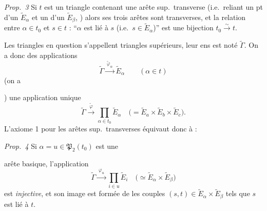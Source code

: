 \documentclass[11pt,a4paper]{article}
\begin{document}
\emph{Prop.~3} Si $t$ est un triangle contenant une arête sup.\ transverse (i.e.\ reliant un pt d'un $\widetilde{E}_{\alpha}$ et un d'un $\widetilde{E}_{\beta}$, ) alors ses trois arêtes sont transverses, et la relation entre $\alpha\in t_0$ et $s\in t$ : ``$\alpha$ est lié à $s$ (i.e.\ $s\in\widetilde{E}_{\alpha}$)'' est une bijection $t_0\xrightarrow{\sim}t$.

Les triangles en question s'appellent triangles supérieurs, leur ens est noté $\widetilde{\Gamma}$. On a donc des applications
\[
  \widetilde{\Gamma}\xrightarrow{\ \widetilde{\varphi}_{\alpha}\ }\widetilde{E}_{\alpha}\qquad(\alpha\in t)
\]
(on a


)   une application unique
\[
  \widetilde{\Gamma}\xrightarrow{\ \widetilde{\varphi}\ }\prod_{\alpha\in t_0}\widetilde{E}_{\alpha}
  \quad\bigl(=\widetilde{E}_{a}\times\widetilde{E}_{b}\times\widetilde{E}_{c}\bigr).
\]
L'axiome 1 pour les arêtes sup.\ transverses équivaut donc à :

\emph{Prop.~4} Si  $\alpha=u\in\mathfrak{P}_2(t_0)$ est une

arête basique,  l'application
\[
  \widetilde{\Gamma}\xrightarrow{\ \varphi_u\ }\prod_{i\in u}\widetilde{E}_i\quad\bigl(\simeq\widetilde{E}_{\alpha}\times\widetilde{E}_{\beta}\bigr)
\]
est \emph{injective}, et son image est formée de  les  couples $(s,t)\in\widetilde{E}_{\alpha}\times\widetilde{E}_{\beta}$ tels que $s$ est lié à $t$.
\end{document}
